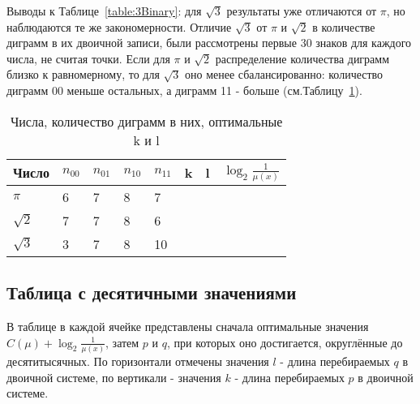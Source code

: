\documentclass[12pt]{article}
\begin{document}
	Выводы к Таблице~\ref{table:3Binary}: для $\sqrt{3}$ результаты уже отличаются от $\pi$, но наблюдаются те же закономерности. Отличие $\sqrt{3}$ от $\pi$ и $\sqrt{2}$ в количестве диграмм в их двоичной записи, были рассмотрены первые 30 знаков для каждого числа, не считая точки. Если для $\pi$ и $\sqrt{2}$ распределение количества диграмм близко к равномерному, то для $\sqrt{3}$ оно менее сбалансированно: количество диграмм 00 меньше остальных, а диграмм 11 - больше (см.Таблицу~\ref{table:digramsPi23}).
	
	\begin{table}[h]
		\caption{Числа, количество диграмм в них, оптимальные k и l}
		\label{table:digramsPi23}
		\begin{center}
			\begin{tabular}{|l|l|l|l|l|l|l|l|}
			\hline
			Число & $n_{00}$ & $n_{01}$ & $n_{10}$ & $n_{11}$ & k & l & $\log_2{\frac{1}{\mu(x)}}$\\
			\hline
			$\pi$ & 6 & 7 & 8 & 7 &&&\\
			\hline
			$\sqrt{2}$ & 7 & 7 & 8 & 6 &&&\\
			\hline
			$\sqrt{3}$ & 3 & 7 & 8 & 10 &&&\\
			\hline
		\end{tabular}
	\end{center}
	\end{table}
	\subsection*{Таблица с десятичными значениями}
	В таблице в каждой ячейке представлены сначала оптимальные значения $C(\mu)+\log_2{\frac{1}{\mu(x)}}$, затем $p$ и $q$, при которых оно достигается, округлённые до десятитысячных. По горизонтали отмечены значения $l$ - длина перебираемых $q$  в двоичной системе, по вертикали - значения $k$ - длина перебираемых $p$  в двоичной системе.
	
\end{document}
